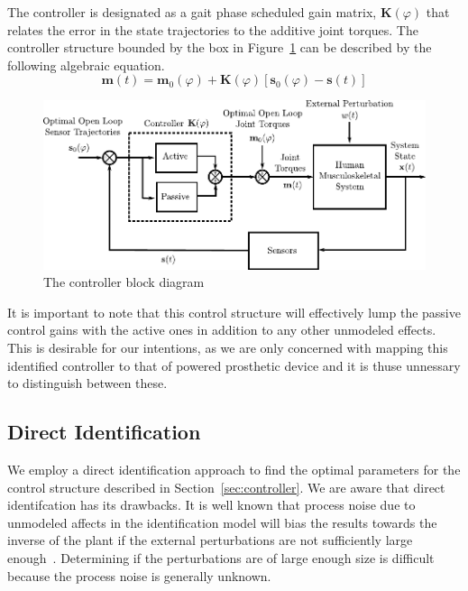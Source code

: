 \documentclass{article}
\begin{document}
The controller is designated as a gait phase scheduled gain matrix,
$\mathbf{K}(\varphi)$ that relates the error in the state trajectories to the
additive joint torques. The controller structure bounded by the box in
Figure~\ref{fig:controller} can be described by the following algebraic
equation.
%
\begin{equation}
  \mathbf{m}(t) = \mathbf{m}_0(\varphi) + \mathbf{K}(\varphi) [\mathbf{s}_0(\varphi) - \mathbf{s}(t)]
  \label{eq:controller}
\end{equation}
%
\begin{figure}
  \centering
  \includegraphics{figures/control-system.pdf}
  \caption{The controller block diagram}
  \label{fig:controller}
\end{figure}

It is important to note that this control structure will effectively lump the
passive control gains with the active ones in addition to any other unmodeled
effects. This is desirable for our intentions, as we are only concerned with
mapping this identified controller to that of powered prosthetic device and it
is thuse unnessary to distinguish between these.

\subsection*{Direct Identification}
%
We employ a direct identification approach to find the optimal parameters for
the control structure described in Section~\ref{sec:controller}. We are aware
that direct identifcation has its drawbacks. It is well known that process
noise due to unmodeled affects in the identification model will bias the
results towards the inverse of the plant if the external perturbations are not
sufficiently large enough~\cite{Ljung1999,Kearney1990,Kooij2005}. Determining
if the perturbations are of large enough size is difficult because the process
noise is generally unknown.
\end{document}
